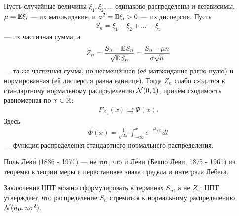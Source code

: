 \documentclass[../main.tex]{subfiles}
\begin{document}
\begin{thm}
 \label{theorem:central_limit_theorem_Levi}
 Пусть случайные величины $ \xi_1, \xi_2, \ldots $  одинаково распределены и независимы, $ \mu = \mathbb E \xi_i $ --- их матожидание, и  $ \sigma^{2} = \mathbb D \xi_i > 0 $  --- их дисперсия. Пусть
 \begin{align*}
  S_n = \xi_1 + \xi_2 + \ldots + \xi_n
 \end{align*} --- их частичная сумма, а
 \begin{align*}
  Z_n = \frac{S_n - \mathbb E S_n}{\sqrt{\mathbb D S_n}} = \frac{S_n - \mu n}{\sigma \sqrt n}
 \end{align*} --- та же частичная сумма, но несмещённая (её матожидание равно нулю) и нормированная (её дисперсия равна единице). Тогда $ Z_n $ слабо сходится к стандартному нормальному распределению $ \mathcal N(0,1) $, причём сходимость равномерная по $ x\in\mathbb{R} $:
 \begin{align*}
  F_{Z_n}(x) \rightrightarrows \Phi(x).
 \end{align*} Здесь
 \begin{align*}
  \Phi(x) = \frac{1}{\sqrt{2\pi}} \int_{-\infty}^{x} e^{-t^{2} / 2}\,dt
 \end{align*} --- функция распределения стандартного нормального распределения.
\end{thm}
\begin{remrk*}
 Поль Лев\'{и} (1886 - 1971) --- не тот, что и Л\'{е}ви (Беппо Леви, 1875 - 1961) из теоремы в теории меры о перестановке знака предела и интеграла Лебега.
\end{remrk*}
\begin{remrk*}
 Заключение ЦПТ можно сформулировать в терминах $ S_n $, а не $ Z_n $: ЦПТ утверждает, что распределение $ S_n $ стремится к нормальному распределению $ \mathcal N(n\mu, n\sigma^{2}) $.
\end{remrk*}
\end{document}
